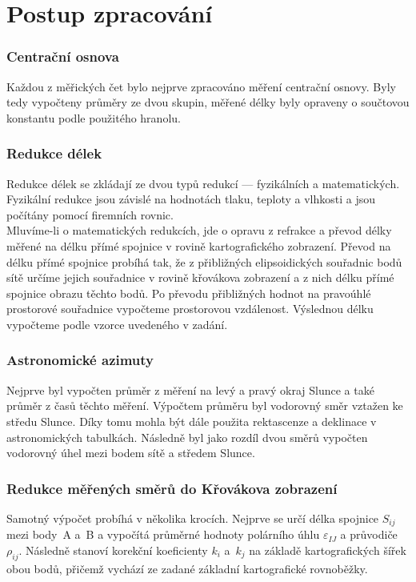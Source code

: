 \section{Postup zpracování}


\subsubsection{Centrační osnova}
\tab Každou z měřických čet bylo nejprve zpracováno měření centrační osnovy. Byly tedy vypočteny
průměry ze dvou skupin, měřené délky byly opraveny o součtovou konstantu podle použitého
hranolu.


\subsubsection{Redukce délek}
\tab Redukce délek se zkládají ze dvou typů redukcí — fyzikálních a matematických. Fyzikální redukce jsou závislé na hodnotách tlaku, teploty a vlhkosti a jsou počítány pomocí firemních rovnic.\\
\tab Mluvíme-li o matematických redukcích, jde o opravu z refrakce a převod délky měřené na délku přímé spojnice v rovině kartografického zobrazení. Převod na délku přímé spojnice probíhá tak, že z přibližných elipsoidických souřadnic bodů sítě určíme jejich souřadnice v rovině křovákova zobrazení a z nich délku přímé spojnice obrazu těchto bodů. Po převodu přibližných hodnot na pravoúhlé prostorové souřadnice vypočteme prostorovou vzdálenost. Výslednou délku vypočteme podle vzorce uvedeného v zadání.

\subsubsection{Astronomické azimuty}
\tab Nejprve byl vypočten průměr z měření na levý a pravý okraj Slunce a také průměr z časů těchto
měření. Výpočtem průměru byl vodorovný směr vztažen ke středu Slunce. Díky tomu mohla být
dále použita rektascenze a deklinace v astronomických tabulkách. Následně byl jako rozdíl dvou směrů vypočten vodorovný úhel mezi bodem sítě a středem Slunce.


\subsubsection{Redukce měřených směrů do Křovákova zobrazení}

Samotný výpočet probíhá v několika krocích. Nejprve se určí délka spojnice $S_{ij}$ mezi body~A a~B a vypočítá průměrné hodnoty polárního úhlu $\varepsilon_{IJ}$ a průvodiče $\rho_{ij}$. Následně stanoví korekční koeficienty $k_i$ a~$k_j$ na základě kartografických šířek obou bodů, přičemž vychází ze zadané základní kartografické rovnoběžky.


